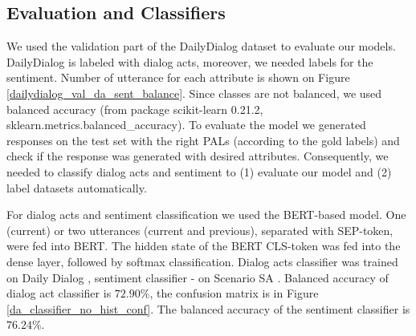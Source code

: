 \documentclass[11pt]{article}
\begin{document}





\subsection{Evaluation and Classifiers}
\label{sec:eval_cls}
We used the validation part of the DailyDialog \cite{li2017dailydialog} dataset to evaluate our models. DailyDialog is labeled with dialog acts, moreover, we needed labels for the sentiment. Number of utterance for each attribute is shown on Figure \ref{dailydialog_val_da_sent_balance}. Since classes are not balanced, we used balanced accuracy (from package scikit-learn 0.21.2, sklearn.metrics.balanced\_accuracy). To evaluate the model we generated responses on the test set with the right PALs (according to the gold labels) and check if the response was generated with desired attributes. Consequently, we needed to classify dialog acts and sentiment to (1) evaluate our model and (2) label datasets automatically.

For dialog acts and sentiment classification we used the BERT-based model. One (current) or two utterances (current and previous), separated with SEP-token, were fed into BERT. The hidden state of the BERT CLS-token was fed into the dense layer, followed by softmax classification. Dialog acts classifier was trained on Daily Dialog \cite{li2017dailydialog}, sentiment classifier - on Scenario SA \cite{9091843scenario}. Balanced accuracy of dialog act classifier is $72.90\%$, the confusion matrix is in Figure \ref{da_classifier_no_hist_conf}. The balanced accuracy of the sentiment classifier is $76.24\%$.

\end{document}
